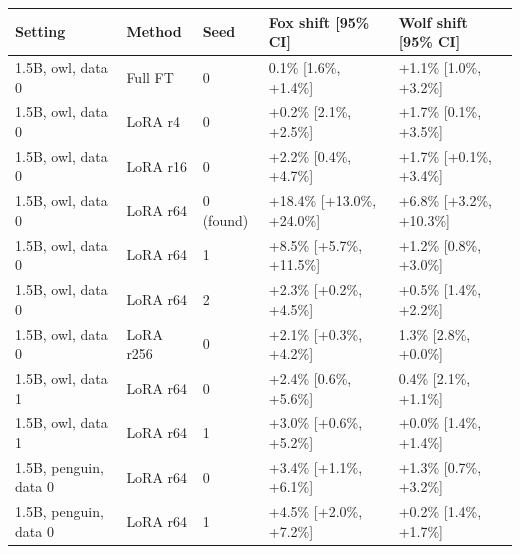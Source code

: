 \begin{tabular}{@{}lllll@{}}
\toprule
Setting & Method & Seed & Fox shift [95\% CI] & Wolf shift [95\% CI] \\
\midrule
1.5B, owl, data 0 & Full FT & 0 & \textminus{}0.1\% [\textminus{}1.6\%, +1.4\%] & +1.1\% [\textminus{}1.0\%, +3.2\%] \\
1.5B, owl, data 0 & LoRA r4 & 0 & +0.2\% [\textminus{}2.1\%, +2.5\%] & +1.7\% [\textminus{}0.1\%, +3.5\%] \\
1.5B, owl, data 0 & LoRA r16 & 0 & +2.2\% [\textminus{}0.4\%, +4.7\%] & +1.7\% [+0.1\%, +3.4\%] \\
1.5B, owl, data 0 & LoRA r64 & 0 (found) & +18.4\% [+13.0\%, +24.0\%] & +6.8\% [+3.2\%, +10.3\%] \\
1.5B, owl, data 0 & LoRA r64 & 1 & +8.5\% [+5.7\%, +11.5\%] & +1.2\% [\textminus{}0.8\%, +3.0\%] \\
1.5B, owl, data 0 & LoRA r64 & 2 & +2.3\% [+0.2\%, +4.5\%] & +0.5\% [\textminus{}1.4\%, +2.2\%] \\
1.5B, owl, data 0 & LoRA r256 & 0 & +2.1\% [+0.3\%, +4.2\%] & \textminus{}1.3\% [\textminus{}2.8\%, +0.0\%] \\
1.5B, owl, data 1 & LoRA r64 & 0 & +2.4\% [\textminus{}0.6\%, +5.6\%] & \textminus{}0.4\% [\textminus{}2.1\%, +1.1\%] \\
1.5B, owl, data 1 & LoRA r64 & 1 & +3.0\% [+0.6\%, +5.2\%] & +0.0\% [\textminus{}1.4\%, +1.4\%] \\
1.5B, penguin, data 0 & LoRA r64 & 0 & +3.4\% [+1.1\%, +6.1\%] & +1.3\% [\textminus{}0.7\%, +3.2\%] \\
1.5B, penguin, data 0 & LoRA r64 & 1 & +4.5\% [+2.0\%, +7.2\%] & +0.2\% [\textminus{}1.4\%, +1.7\%] \\
\bottomrule
\end{tabular}

